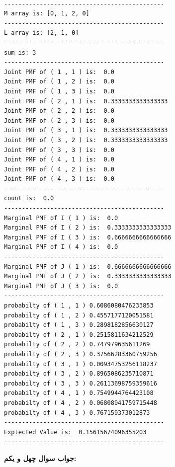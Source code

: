 \documentclass[a4paper,14pt]{article}
\begin{document}
\begin{latin}
	\begin{lstlisting}

---------------------------------------------
M array is: [0, 1, 2, 0]
---------------------------------------------
L array is: [2, 1, 0]
---------------------------------------------
sum is: 3
---------------------------------------------
Joint PMF of ( 1 , 1 ) is:  0.0
Joint PMF of ( 1 , 2 ) is:  0.0
Joint PMF of ( 1 , 3 ) is:  0.0
Joint PMF of ( 2 , 1 ) is:  0.3333333333333333
Joint PMF of ( 2 , 2 ) is:  0.0
Joint PMF of ( 2 , 3 ) is:  0.0
Joint PMF of ( 3 , 1 ) is:  0.3333333333333333
Joint PMF of ( 3 , 2 ) is:  0.3333333333333333
Joint PMF of ( 3 , 3 ) is:  0.0
Joint PMF of ( 4 , 1 ) is:  0.0
Joint PMF of ( 4 , 2 ) is:  0.0
Joint PMF of ( 4 , 3 ) is:  0.0
---------------------------------------------
count is:  0.0
---------------------------------------------
Marginal PMF of I ( 1 ) is:  0.0
Marginal PMF of I ( 2 ) is:  0.3333333333333333
Marginal PMF of I ( 3 ) is:  0.6666666666666666
Marginal PMF of I ( 4 ) is:  0.0
---------------------------------------------
Marginal PMF of J ( 1 ) is:  0.6666666666666666
Marginal PMF of J ( 2 ) is:  0.3333333333333333
Marginal PMF of J ( 3 ) is:  0.0
---------------------------------------------
probabilty of ( 1 , 1 ) 0.6086080476233853
probabilty of ( 1 , 2 ) 0.4557177120051581
probabilty of ( 1 , 3 ) 0.2898182856630127
probabilty of ( 2 , 1 ) 0.2515811634212529
probabilty of ( 2 , 2 ) 0.747979635611269
probabilty of ( 2 , 3 ) 0.37566283360759256
probabilty of ( 3 , 1 ) 0.00934753256118237
probabilty of ( 3 , 2 ) 0.8965086235710871
probabilty of ( 3 , 3 ) 0.26113698759359616
probabilty of ( 4 , 1 ) 0.7549944764423108
probabilty of ( 4 , 2 ) 0.06808941759715448
probabilty of ( 4 , 3 ) 0.767159373012873
---------------------------------------------
Exptected Value is:  0.15615674096355203
---------------------------------------------

	\end{lstlisting}
\end{latin}


\textbf{جواب سوال چهل و یکم:}\\
\end{document}
